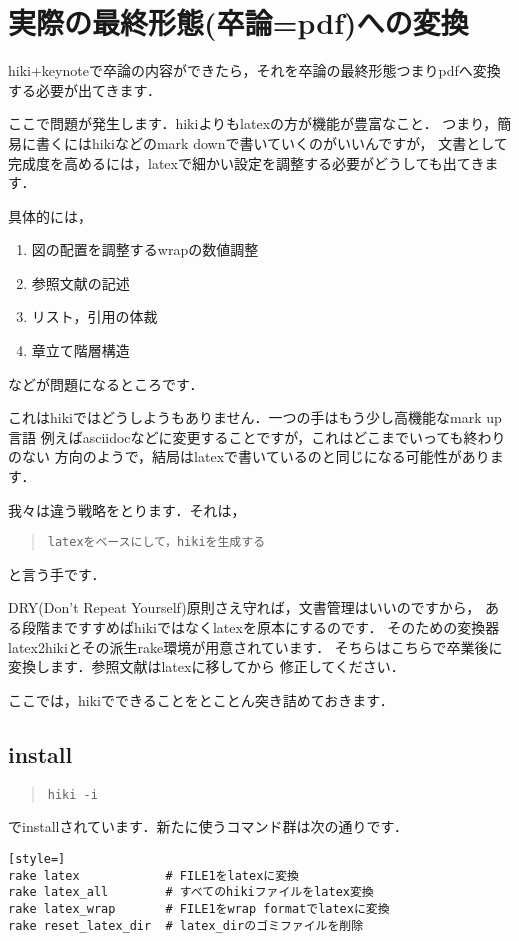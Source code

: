 
\section{実際の最終形態(卒論=pdf)への変換}
hiki+keynoteで卒論の内容ができたら，それを卒論の最終形態つまりpdfへ変換する必要が出てきます．

ここで問題が発生します．hikiよりもlatexの方が機能が豊富なこと．
つまり，簡易に書くにはhikiなどのmark downで書いていくのがいいんですが，
文書として完成度を高めるには，latexで細かい設定を調整する必要がどうしても出てきます．

具体的には，

\begin{enumerate}
\item 図の配置を調整するwrapの数値調整
\item 参照文献の記述
\item リスト，引用の体裁
\item 章立て階層構造
\end{enumerate}
などが問題になるところです．

これはhikiではどうしようもありません．一つの手はもう少し高機能なmark up言語
例えばasciidocなどに変更することですが，これはどこまでいっても終わりのない
方向のようで，結局はlatexで書いているのと同じになる可能性があります．

我々は違う戦略をとります．それは，
\begin{quote}\begin{verbatim}
latexをベースにして，hikiを生成する
\end{verbatim}\end{quote}
と言う手です．

DRY(Don't Repeat Yourself)原則さえ守れば，文書管理はいいのですから，
ある段階まですすめばhikiではなくlatexを原本にするのです．
そのための変換器latex2hikiとその派生rake環境が用意されています．
そちらはこちらで卒業後に変換します．参照文献はlatexに移してから
修正してください．

ここでは，hikiでできることをとことん突き詰めておきます．

\subsection{install}\begin{quote}\begin{verbatim}
hiki -i
\end{verbatim}\end{quote}
でinstallされています．新たに使うコマンド群は次の通りです．
\begin{lstlisting}[style=]
rake latex            # FILE1をlatexに変換
rake latex_all        # すべてのhikiファイルをlatex変換
rake latex_wrap       # FILE1をwrap formatでlatexに変換
rake reset_latex_dir  # latex_dirのゴミファイルを削除
\end{lstlisting}
